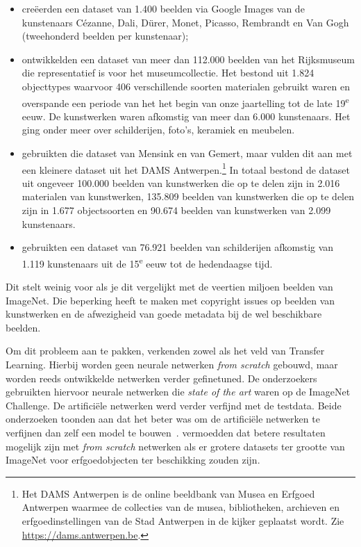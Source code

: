 \begin{itemize}
	\item \textcite{Blessings2013} cre\"{e}erden een dataset van 1.400 beelden via Google Images van de kunstenaars C\'{e}zanne, Dali, D\"{u}rer, Monet, Picasso, Rembrandt en Van Gogh (tweehonderd beelden per kunstenaar);
	\item \textcite{Mensink2014} ontwikkelden een dataset van meer dan 112.000 beelden van het Rijksmuseum die representatief is voor het museumcollectie. Het bestond uit 1.824 objecttypes waarvoor 406 verschillende soorten materialen gebruikt waren en overspande een periode van het het begin van onze jaartelling tot de late 19\textsuperscript{e} eeuw. De kunstwerken waren afkomstig van meer dan 6.000 kunstenaars. Het ging onder meer over schilderijen, foto’s, keramiek en meubelen.
	\item \textcite{Sabatteli2018} gebruikten die dataset van Mensink en van Gemert, maar vulden dit aan met een kleinere dataset uit het DAMS Antwerpen.\footnote{Het DAMS Antwerpen is de online beeldbank van Musea en Erfgoed Antwerpen waarmee de collecties van de musea, bibliotheken, archieven en erfgoedinstellingen van de Stad Antwerpen in de kijker geplaatst wordt. Zie \url{https://dams.antwerpen.be}.} In totaal bestond de dataset uit ongeveer 100.000 beelden van kunstwerken die op te delen zijn in 2.016 materialen van kunstwerken, 135.809 beelden van kunstwerken die op te delen zijn in 1.677 objectsoorten en 90.674 beelden van kunstwerken van 2.099 kunstenaars.
	\item \textcite{Elgammal2018} gebruikten een dataset van 76.921 beelden van schilderijen afkomstig van 1.119 kunstenaars uit de 15\textsuperscript{e} eeuw tot de hedendaagse tijd.
\end{itemize}

Dit stelt weinig voor als je dit vergelijkt met de veertien miljoen beelden van ImageNet. Die beperking heeft te maken met copyright issues op beelden van kunstwerken en de afwezigheid van goede metadata bij de wel beschikbare beelden. 

Om dit probleem aan te pakken, verkenden zowel \textcite{Sabatteli2018} als \textcite{Elgammal2018} het veld van Transfer Learning. Hierbij worden geen neurale netwerken \textit{from scratch} gebouwd, maar worden reeds ontwikkelde netwerken verder gefinetuned. De onderzoekers gebruikten hiervoor neurale netwerken die \textit{state of the art} waren op de ImageNet Challenge. De artifici\"{e}le netwerken werd verder verfijnd met de testdata. Beide onderzoeken toonden aan dat het beter was om de artificiële netwerken te verfijnen dan zelf een model te bouwen~\autocite{Sabatteli2018}. \textcite{Elgammal2018} vermoedden dat betere resultaten mogelijk zijn met \textit{from scratch} netwerken als er grotere datasets ter grootte van ImageNet voor erfgoedobjecten ter beschikking zouden zijn.

